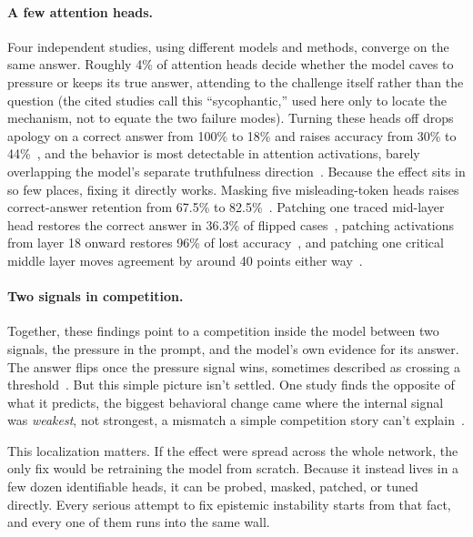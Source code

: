 \paragraph{A few attention heads.} Four independent studies, using different models and methods, converge on the same answer. Roughly 4\% of attention heads decide whether the model caves to pressure or keeps its true answer, attending to the challenge itself rather than the question (the cited studies call this ``sycophantic,'' used here only to locate the mechanism, not to equate the two failure modes). Turning these heads off drops apology on a correct answer from 100\% to 18\% and raises accuracy from 30\% to 44\%~\citep{FromYesMenToTruth_Chen}, and the behavior is most detectable in attention activations, barely overlapping the model's separate truthfulness direction~\citep{SycophancyHidesLinearly_Genadi}. Because the effect sits in so few places, fixing it directly works. Masking five misleading-token heads raises correct-answer retention from 67.5\% to 82.5\%~\citep{InterpretingAndMitigatingUnwanted_Roy}. Patching one traced mid-layer head restores the correct answer in 36.3\% of flipped cases~\citep{HowLLMsArePersuaded_Sun}, patching activations from layer 18 onward restores 96\% of lost accuracy~\citep{NotJustRLHFWhy_Kumarappan}, and patching one critical middle layer moves agreement by around 40 points either way~\citep{WhenTruthIsOverridden_Wang}.

\paragraph{Two signals in competition.} Together, these findings point to a competition inside the model between two signals, the pressure in the prompt, and the model's own evidence for its answer. The answer flips once the pressure signal wins, sometimes described as crossing a threshold~\citep{HumanLikeSocialCompliance_Zhang}. But this simple picture isn't settled. One study finds the opposite of what it predicts, the biggest behavioral change came where the internal signal was \emph{weakest}, not strongest, a mismatch a simple competition story can't explain~\citep{UnderPressureEmotionalFraming_Usman}.

This localization matters. If the effect were spread across the whole network, the only fix would be retraining the model from scratch. Because it instead lives in a few dozen identifiable heads, it can be probed, masked, patched, or tuned directly. Every serious attempt to fix epistemic instability starts from that fact, and every one of them runs into the same wall.

